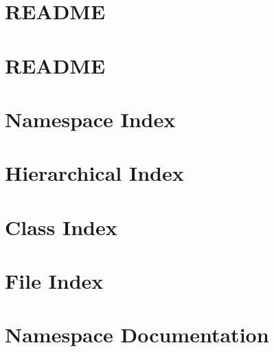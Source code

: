 \documentclass[twoside]{book}
\newcommand{\+}{\discretionary{\mbox{\scriptsize$\hookleftarrow$}}{}{}}
\begin{document}
\chapter{R\+E\+A\+D\+ME}
\label{md_smacc_sm_reference_library_sm_dance_bot_README}
\hypertarget{md_smacc_sm_reference_library_sm_dance_bot_README}{}

\chapter{R\+E\+A\+D\+ME}
\label{md_smacc_sm_reference_library_sm_three_some_README}
\hypertarget{md_smacc_sm_reference_library_sm_three_some_README}{}

\chapter{Namespace Index}

\chapter{Hierarchical Index}

\chapter{Class Index}

\chapter{File Index}

\chapter{Namespace Documentation}


































\end{document}
